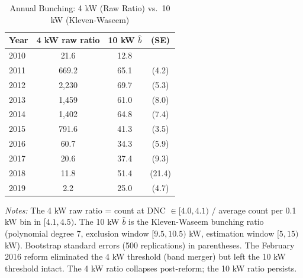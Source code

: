 \begin{table}[t]
\centering
\caption{Annual Bunching: 4 kW (Raw Ratio) vs.\ 10 kW (Kleven-Waseem)}
\label{tab:annual}
\begin{tabular}{lccc}
\toprule
Year & 4 kW raw ratio & 10 kW $\hat{b}$ & (SE) \\
\midrule
  2010 & 21.6 & 12.8 &  \\
  2011 & 669.2 & 65.1 & (4.2) \\
  2012 & 2,230 & 69.7 & (5.3) \\
  2013 & 1,459 & 61.0 & (8.0) \\
  2014 & 1,402 & 64.8 & (7.4) \\
  2015 & 791.6 & 41.3 & (3.5) \\
  \midrule
  2016 & 60.7 & 34.3 & (5.9) \\
  2017 & 20.6 & 37.4 & (9.3) \\
  2018 & 11.8 & 51.4 & (21.4) \\
  2019 & 2.2 & 25.0 & (4.7) \\
\bottomrule
\end{tabular}

\begin{flushleft}\small \textit{Notes:} The 4 kW raw ratio = count at DNC $\in [4.0, 4.1)$ / average count per 0.1 kW bin in $[4.1, 4.5)$. The 10 kW $\hat{b}$ is the Kleven-Waseem bunching ratio (polynomial degree 7, exclusion window $[9.5, 10.5)$ kW, estimation window $[5, 15)$ kW). Bootstrap standard errors (500 replications) in parentheses. The February 2016 reform eliminated the 4 kW threshold (band merger) but left the 10 kW threshold intact. The 4 kW ratio collapses post-reform; the 10 kW ratio persists.\end{flushleft}
\end{table}

